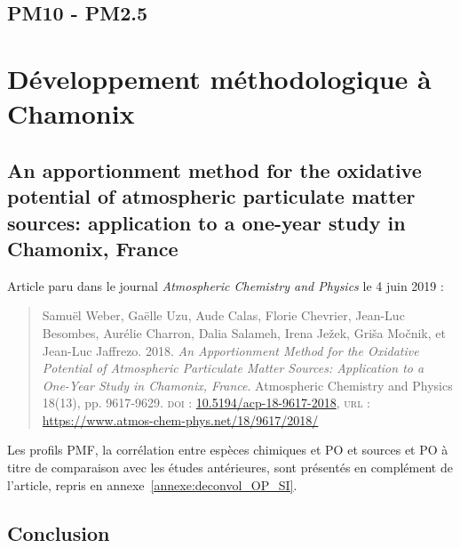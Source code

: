 \subsection{PM10 - PM2.5}%
\label{sub:pm10_pm2_5}




\section{Développement méthodologique à Chamonix}%
\label{ssub:développement_méthodologique_à_chamonix}

\clearpage
\subsection{An apportionment method for the oxidative potential of atmospheric particulate
matter sources: application to a one-year study in Chamonix, France}
\label{sec:weber_et_al_2018}

\begin{tcolorbox}[colback=red!5!white,colframe=Melon,title=Note]
Article paru dans le journal \textit{Atmospheric Chemistry and Physics} le 4 juin 2019 :

\begin{quote}
    Samuël Weber, Gaëlle Uzu, Aude Calas, Florie Chevrier, Jean-Luc Besombes,
    Aurélie Charron, Dalia Salameh, Irena Ježek, Griša Močnik, et Jean-Luc Jaffrezo. 2018.
    \textit{An Apportionment Method for the Oxidative Potential of Atmospheric Particulate
    Matter Sources: Application to a One-Year Study in Chamonix, France}. Atmospheric
    Chemistry and Physics 18(13), pp. 9617‑9629.
    \textsc{doi} : \href{https://doi.org/10.5194/acp-18-9617-2018}{10.5194/acp-18-9617-2018},
    \textsc{url} : \url{https://www.atmos-chem-phys.net/18/9617/2018/}
\end{quote}

Les profils PMF, la corrélation entre espèces chimiques et PO et sources et
PO à titre de comparaison avec les études antérieures, sont présentés en complément de
l'article, repris en annexe~\ref{annexe:deconvol_OP_SI}.
\end{tcolorbox}




\subsection{Conclusion}

